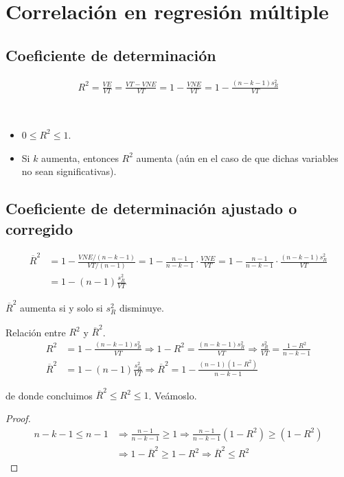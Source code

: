 \section{Correlación en regresión múltiple}

\subsection{Coeficiente de determinación}

\begin{align*}
    R^2 = \frac{VE}{VT} = \frac{VT - VNE}{VT} = 1 - \frac{VNE}{VT} = 1 - \frac{(n-k-1)s_R^2}{VT}
\end{align*}
\begin{obs}
    \
    \begin{itemize}
        \item $0 \leq R^2 \leq 1$.
        \item Si $k$ aumenta, entonces $R^2$ aumenta (aún en el caso de que dichas variables no sean significativas).
    \end{itemize}
\end{obs}

\subsection{Coeficiente de determinación ajustado o corregido}

\begin{align*}
    \overline{R}^2 & = 1 - \frac{VNE/(n-k-1)}{VT/(n-1)} = 1 - \frac{n-1}{n-k-1} \cdot \frac{VNE}{VT} = 1 - \frac{n-1}{n-k-1} \cdot \frac{(n-k-1)s_R^2}{VT} \\
                   & = 1 - (n-1) \frac{s_R^2}{VT}
\end{align*}
\begin{obs}
    $\overline{R}^2$ aumenta si y solo si $s_R^2$ disminuye.
\end{obs}

\begin{obs}
    Relación entre $R^2$ y $\overline{R}^2$.
    \begin{align*}
        R^2            & = 1 - \frac{(n-k-1)s_R^2}{VT} \Longrightarrow 1 - R^2 = \frac{(n-k-1)s_R^2}{VT} \Longrightarrow \frac{s_R^2}{VT} = \frac{1 - R^2}{n-k-1} \\
        \overline{R}^2 & = 1 - (n-1) \frac{s_R^2}{VT} \Longrightarrow \overline{R}^2 = 1 - \frac{(n-1)(1-R^2)}{n-k-1}
    \end{align*}
\end{obs}
de donde concluimos $\boxed{\overline{R}^2 \leq R^2 \leq 1}$. Veámoslo.
\begin{proof}
    \begin{align*}
        n-k-1 \leq n -1 & \Longrightarrow \frac{n-1}{n-k-1} \ge 1
        \Longrightarrow \frac{n-1}{n-k-1}(1-R^2) \ge (1-R^2)             \\
                        & \Longrightarrow 1 - \overline{R}^2 \ge 1 - R^2
        \Longrightarrow \overline{R}^2 \leq R^2
    \end{align*}
\end{proof}

